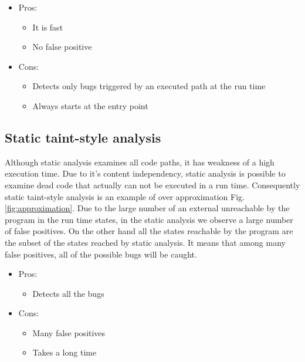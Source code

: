 \documentclass[a4paper, 12pt, journal, onecolumn]{IEEEtran}
\begin{document}
\begin{itemize}
\item Pros:	

\begin{itemize}
\item It is fast	
\item No false positive
\end{itemize}

\item Cons:

\begin{itemize}
\item Detects only bugs triggered by an executed path at the run time
\item Always starts at the entry point
\end{itemize}

\end{itemize}

\subsection{Static taint-style analysis}

Although static analysis examines all code paths, it has weakness of a high execution time. Due to it's content independency, static analysis  is possible to examine dead code that actually can not be executed in a run time. Consequently static taint-style analysis is an example of over approximation Fig.\ref{fig:approximation}.
Due to the large number of an external unreachable by the program in the run time states, in the static analysis we observe a large number of false positives. On the other hand all the states reachable by the program are the subset of the states reached by static analysis. It means that among many false positives, all of the possible bugs will be caught. \cite{a5}\cite{a6}

\begin{itemize}
\item Pros:	

\begin{itemize}
\item Detects all the bugs

\end{itemize}

\item Cons:

\begin{itemize}
\item Many false positives

\item Takes a long time
\end{itemize}

\end{itemize}
\end{document}
